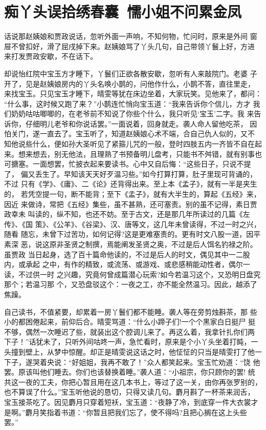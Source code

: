 \chapter{痴丫头误拾绣春囊~懦小姐不问累金凤}

话说那赵姨娘和贾政说话，忽听外面一声响，不知何物，忙问时，原来是外间
窗屉不曾扣好，滑了屈戌掉下来。赵姨娘骂了丫头几句，自己带领丫鬟上好，方进
来打发贾政安歇，不在话下。

却说怡红院中宝玉方才睡下，丫鬟们正欲各散安歇，忽听有人来敲院门。老婆
子开了，见是赵姨娘房内的丫头名唤小鹊的，问他作什么，小鹊不答，直往里走，
来找宝玉。只见宝玉才睡下，晴雯等犹在床边坐着，大家玩笑。见他来了，都问：
“什么事，这时候又跑了来？”小鹊连忙悄向宝玉道：“我来告诉你个信儿，方才
我们奶奶咕咕唧唧的，在老爷前不知说了你些个什么，我只听见‘宝玉’二字。我
来告诉你，仔细明儿老爷和你说话罢。”一面说着，回身就走。袭人命人留他吃茶，
因怕关门，遂一直去了。宝玉听了，知道赵姨娘心术不端，合自己仇人似的，又不
知他说些什么，便如孙大圣听见了紧箍儿咒的一般，登时四肢五内一齐皆不自在起
来。想来想去，别无他法，且理熟了书预备明儿盘考，只能书不舛错，就有别事也
可搪塞。一面想罢，忙披衣起来要读书。心中又自后悔：“这些日子，只说不提了，
偏又丢生了。早知该天天好歹温习些。”如今打算打算，肚子里现可背诵的，不过
只有《学》、《庸》、二《论》还背得出来。至上本《孟子》，就有一半是夹生的，
若凭空提一句，断不能背；至下《孟子》，就有大半生的，算起《五经》来，因近
来做诗，常把《五经》集些，虽不甚熟，还可塞责。别的虽不记得，素日贾政幸未
叫读的，纵不知，也还不妨。至于古文，还是那几年所读过的几篇《左传》、《国
策》、《公羊》、《谷梁》、汉、唐等文，这几年未曾读得，不过一时之兴，随看
随忘，未曾下过苦功，如何记得?这是更难塞责的。更有时文八股一道，因平素深
恶，说这原非圣贤之制撰，焉能阐发圣贤之奥，不过是后人饵名钓禄之阶。虽贾政
当日起身，选了百十篇命他读的，不过是后人的时文，偶见其中一二股内，或承起
之中，有作的精致，或流荡、或游戏、或悲感稍能动性者，偶尔一读，不过供一时
之兴趣，究竟何曾成篇潜心玩索?如今若温习这个，又恐明日盘究那个；若温习那
个，又恐盘驳这个：一夜之工，亦不能全然温习。因此，越添了焦躁。

自己读书，不值紧要，却累着一房丫鬟们都不能睡。袭人等在旁剪烛斟茶，那
些小的都困倦起来，前仰后合。晴雯骂道：“什么小蹄子们!一个个黑家白日挺尸
挺不够，偶然一次睡迟了些，就装出这个腔调儿来了。再这么着，我拿针扎你们两
下子！”话犹未了，只听外间咕咚一声，急忙看时，原来是个小丫头坐着打盹，一
头撞到壁上，从梦中惊醒。却正是晴雯说这话之时，他怔怔的只当是晴雯打了他一
下子，遂哭着央说：“好姐姐，我再不敢了！”众人都笑起来。宝玉忙劝道：“饶
他罢。原该叫他们睡去。你们也该替换着睡。”袭人道：“小祖宗，你只顾你的罢!
统共这一夜的工夫，你把心暂且用在这几本书上，等过了这一关，由你再张罗别的，
也不算误了什么。”宝玉听他说的恳切，只得又读几句。麝月斟了一杯茶来润舌，
宝玉接茶吃了。因见麝月只穿着短袄，宝玉道：“夜静了冷，到底穿一件大衣裳才
是啊。”麝月笑指着书道：“你暂且把我们忘了，使不得吗?且把心搁在这上头些
罢。”


